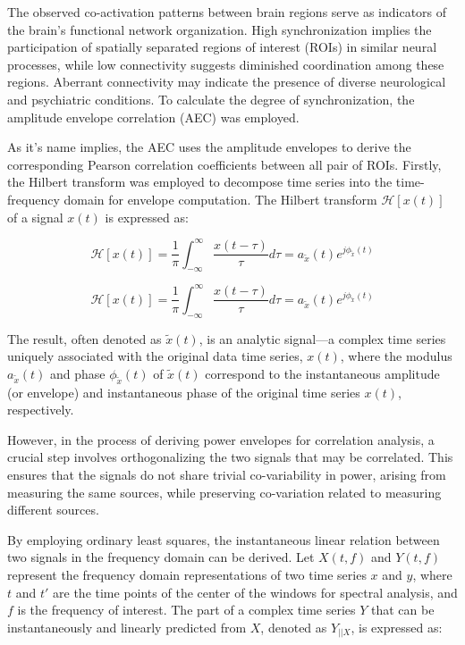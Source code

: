 \documentclass{cys}
\begin{document}
\bigskip
The observed co-activation patterns between brain regions serve as indicators of the brain's functional network organization. High synchronization implies the participation of spatially separated regions of interest (ROIs) in similar neural processes, while low connectivity suggests diminished coordination among these regions. Aberrant connectivity may indicate the presence of diverse neurological and psychiatric conditions. To calculate the degree of synchronization, the amplitude envelope correlation (AEC) was employed.  



\bigskip
As it's name implies, the AEC uses the amplitude envelopes to derive the corresponding Pearson correlation coefficients between all pair of ROIs. Firstly, the Hilbert transform was employed to decompose time series into the time-frequency domain for envelope computation. The Hilbert transform $\mathcal{H}[x(t)]$ of a signal $x(t)$ is expressed as:

\begin{equation}
\mathcal{H}[x(t)]=\frac{1}{\pi}\int_{-\infty}^{\infty}\frac{x(t-\tau)}{\tau}d\tau=a_{\tilde{x}}(t)e^{j\phi_{\tilde{x}}(t)}
\end{equation}

\begin{equation}
\mathcal{H}[x(t)]=\frac{1}{\pi}\int_{-\infty}^{\infty}\frac{x(t-\tau)}{\tau}d\tau=a_{\tilde{x}}(t)e^{j\phi_{\tilde{x}}(t)} 
\end{equation}

The result, often denoted as $\tilde{x}(t)$, is an analytic signal—a complex time series uniquely associated with the original data time series, $x(t)$, where the modulus $a_{\tilde{x}}(t)$ and phase $\phi_{\tilde{x}}(t)$ of $\tilde{x}(t)$ correspond to the instantaneous amplitude (or envelope) and instantaneous phase of the original time series $x(t)$, respectively.

\bigskip
However, in the process of deriving power envelopes for correlation analysis, a crucial step involves orthogonalizing the two signals that may be correlated. This ensures that the signals do not share trivial co-variability in power, arising from measuring the same sources, while preserving co-variation related to measuring different sources.

\bigskip
By employing ordinary least squares, the instantaneous linear relation between two signals in the frequency domain can be derived. Let $X(t,f)$ and $Y(t,f)$ represent the frequency domain representations of two time series $x$ and $y$, where $t$ and $t'$ are the time points of the center of the windows for spectral analysis, and $f$ is the frequency of interest. The part of a complex time series $Y$ that can be instantaneously and linearly predicted from $X$, denoted as $Y_{||X}$, is expressed as:
\small
\end{document}

